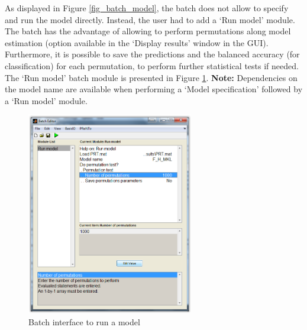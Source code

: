 As displayed in Figure \ref{fig_batch_model}, the batch does not allow to specify and run the model directly. Instead, the user had to add a `Run model' module. The batch has the advantage of allowing to perform permutations along model estimation (option available in the `Display results' window in the GUI). Furthermore, it is possible to save the predictions and the balanced accuracy (for classification) for each permutation, to perform further statistical tests if needed. The `Run model' batch module is presented in Figure \ref{fig_batch_runmodel}. \textbf{Note:} Dependencies on the model name are available when performing a `Model specification' followed by a `Run model' module.

\begin{figure}[!h]
\begin{center}
\includegraphics[height=3.5in]{images/prt_batch_runmodel.PNG}
\caption{Batch interface to run a model}
 \label{fig_batch_runmodel}
\end{center}
\end{figure}

